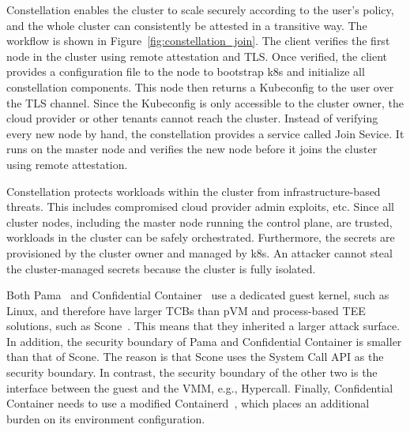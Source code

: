 Constellation enables the cluster to scale securely according to the user's policy, and the whole cluster can consistently be attested in a transitive way. The workflow is shown in Figure~\ref{fig:constellation_join}. The client verifies the first node in the cluster using remote attestation and TLS. 
Once verified, the client provides a configuration file to the node to bootstrap k8s and initialize all constellation components. This node then returns a Kubeconfig to the user over the TLS channel. Since the Kubeconfig is only accessible to the cluster owner, the cloud provider or other tenants 
cannot reach the cluster. Instead of verifying every new node by hand, the constellation provides a service called Join Sevice. It runs on the master node and verifies the new node before it joins the cluster using remote attestation.

Constellation protects workloads within the cluster from infrastructure-based threats. This includes compromised cloud provider admin exploits, etc. Since all cluster nodes, including the master node running the control plane, are trusted, workloads in the cluster can be safely orchestrated. 
Furthermore, the secrets are provisioned by the cluster owner and managed by k8s. An attacker cannot steal the cluster-managed secrets because the cluster is fully isolated.
 
 
Both Pama~\cite*{Johnson2023ParmaCC} and Confidential Container~\cite*{confidential_kata} use a dedicated guest kernel, such as Linux, and therefore have larger TCBs than pVM and process-based TEE solutions, such as Scone~\cite*{10.5555/3026877.3026930}. This means that they inherited a larger attack 
surface. In addition, the security boundary of Pama and Confidential Container is smaller than that of Scone. The reason is that Scone uses the System Call API as the security boundary. In contrast, the security boundary of the other two is the interface between the guest and the VMM, e.g., 
Hypercall. Finally, Confidential Container needs to use a modified Containerd~\cite*{containerd}, which places an additional burden on its environment configuration. 



\cleardoublepage

